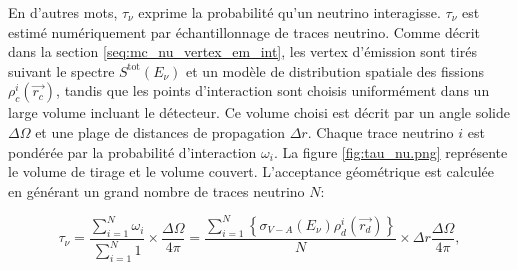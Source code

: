 
En d'autres mots, $\tau_\nu$ exprime la probabilité qu'un neutrino interagisse. $\tau_\nu$ est estimé numériquement par échantillonnage de traces neutrino. Comme décrit dans la section \ref{seq:mc_nu_vertex_em_int}, les vertex d'émission sont tirés suivant le spectre $S^\textrm{tot}(E_\nu)$ et un modèle de distribution spatiale des fissions $\rho^i_c(\overrightarrow{r_c})$, tandis que les points d'interaction sont choisis uniformément dans un large volume incluant le détecteur. Ce volume choisi est décrit par un angle solide $\Delta \Omega$ et une plage de distances de propagation $\Delta r$. Chaque trace neutrino $i$ est pondérée par la probabilité d'interaction $\omega_i$. La figure \ref{fig:tau_nu.png} représente le volume de tirage et le volume couvert. L'acceptance géométrique est calculée en générant un grand nombre de traces neutrino $N$:

\begin{equation}
\label{eq:numerical_geom_acc}
    \tau_\nu = \frac{\sum_{i=1}^{N} \omega_i}{\sum_{i=1}^{N} 1} \times \frac{\Delta \Omega}{4\pi} = \frac{\sum_{i=1}^{N} \left\{ \sigma_{V-A}(E_\nu) \rho^i_d(\overrightarrow{r_d}) \right\} }{N} \times \Delta r \frac{\Delta \Omega}{4\pi},
\end{equation}

